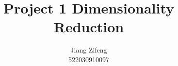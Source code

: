 \documentclass[lang=en]{style}
\author{Jiang Zifeng\\522030910097}
\date{}
\title{Project 1 Dimensionality Reduction}
\begin{document}
\maketitle

\section{}
\end{document}
